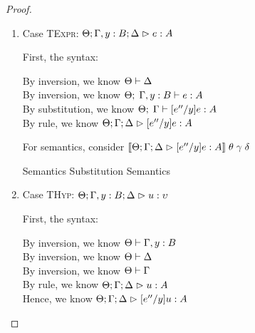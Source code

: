 \begin{proof}
\begin{enumerate}
  For semantics,  $\interp{\judgeA[\Theta; \Gamma; \Delta]{[e''/y]\tau'}{\kappa'}}\;\theta\;\gamma\;\delta$
  \begin{eqnproof}
          {Semantics}
          {Semantics}
  \end{eqnproof}

  \item Case \textsc{TExpr}: $\judgeA[\Theta; \Gamma, y:B; \Delta]{e}{A}$

    First, the syntax:
    \begin{tabbedproof}
      \oo By inversion, we know $\judgectx{\Theta}{\Delta}$ \\
      \oo By inversion, we know $\judgeE{\Gamma, y:B}{e}{A}$ \\
      \oo By substitution, we know $\judgeE{\Gamma}{[e''/y]e}{A}$ \\
      \oo By rule, we know $\judgeA[\Theta; \Gamma; \Delta]{[e''/y]e}{A}$
    \end{tabbedproof}

    For semantics, consider $\interp{\judgeA[\Theta; \Gamma; \Delta]{[e''/y]e}{A}}\;\theta\;\gamma\;\delta$
    \begin{eqnproof}
            {Semantics}
            {Substitution}
            {Semantics}
    \end{eqnproof}

\item Case \textsc{THyp}: $\judgeA[\Theta; \Gamma, y:B; \Delta]{u}{\upsilon}$

  First, the syntax:
  \begin{tabbedproof}
    \oo By inversion, we know $\judgectx{\Theta}{\Gamma, y:B}$\\
    \oo By inversion, we know $\judgectx{\Theta}{\Delta}$\\
    \oo By inversion, we know $\judgectx{\Theta}{\Gamma}$\\
    \oo By rule, we know $\judgeA[\Theta; \Gamma; \Delta]{u}{A}$\\
    \oo Hence, we know $\judgeA[\Theta; \Gamma; \Delta]{[e''/y]u}{A}$\\
  \end{tabbedproof}


\end{enumerate}
\end{proof}
